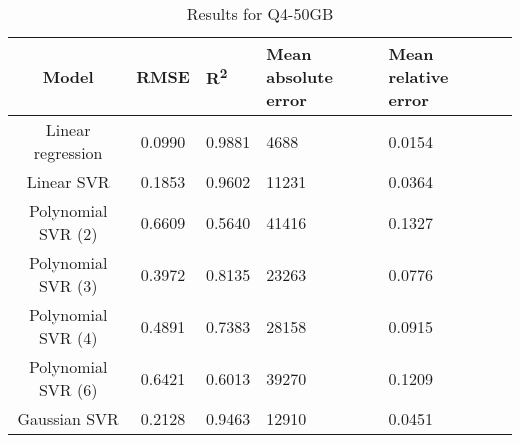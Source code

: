\begin{table}[H]
\centering
\begin{adjustbox}{center}
\begin{tabular}{c | c M{1.2cm} M{2.5cm} M{2.5cm} M{1.8cm}}
Model & RMSE & R\textsuperscript{2} & Mean absolute error & Mean relative error \tabularnewline
\hline
Linear regression & 0.0990 & 0.9881 &   4688 & 0.0154 \\
Linear SVR & 0.1853 & 0.9602 &  11231 & 0.0364 \\
Polynomial SVR (2) & 0.6609 & 0.5640 &  41416 & 0.1327 \\
Polynomial SVR (3) & 0.3972 & 0.8135 &  23263 & 0.0776 \\
Polynomial SVR (4) & 0.4891 & 0.7383 &  28158 & 0.0915 \\
Polynomial SVR (6) & 0.6421 & 0.6013 &  39270 & 0.1209 \\
Gaussian SVR & 0.2128 & 0.9463 &  12910 & 0.0451 \\
\end{tabular}
\end{adjustbox}
\\
\caption{Results for Q4-50GB}
\label{tab:all_linear_Q4_50}
\end{table}
